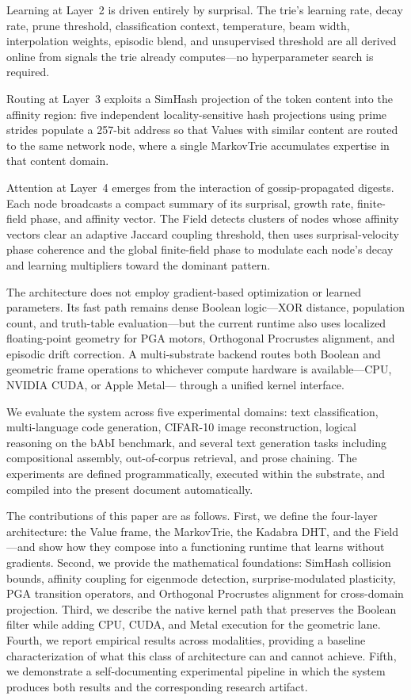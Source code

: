 Learning at Layer~2 is driven entirely by surprisal.  The trie's
learning rate, decay rate, prune threshold, classification context,
temperature, beam width, interpolation weights, episodic blend, and
unsupervised threshold are all derived online from signals the trie
already computes---no hyperparameter search is required.

Routing at Layer~3 exploits a SimHash projection of the token content
into the affinity region: five independent locality-sensitive hash
projections using prime strides populate a 257-bit address so that
Values with similar content are routed to the same network node, where a
single MarkovTrie accumulates expertise in that content domain.

Attention at Layer~4 emerges from the interaction of gossip-propagated
digests.  Each node broadcasts a compact summary of its surprisal,
growth rate, finite-field phase, and affinity vector.  The Field detects
clusters of nodes whose affinity vectors clear an adaptive Jaccard
coupling threshold, then uses surprisal-velocity phase coherence and the
global finite-field phase to modulate each node's decay and learning
multipliers toward the dominant pattern.

The architecture does not employ gradient-based optimization or learned
parameters.  Its fast path remains dense Boolean logic---XOR distance,
population count, and truth-table evaluation---but the current runtime
also uses localized floating-point geometry for PGA motors, Orthogonal
Procrustes alignment, and episodic drift correction.  A multi-substrate
backend routes both Boolean and geometric frame operations to whichever
compute hardware is available---CPU, NVIDIA CUDA, or Apple Metal---
through a unified kernel interface.

We evaluate the system across five experimental domains: text
classification, multi-language code generation, CIFAR-10 image
reconstruction, logical reasoning on the bAbI benchmark, and several
text generation tasks including compositional assembly, out-of-corpus
retrieval, and prose chaining.  The experiments are defined
programmatically, executed within the substrate, and compiled into the
present document automatically.

The contributions of this paper are as follows.  First, we define the
four-layer architecture: the Value frame, the MarkovTrie, the Kadabra
DHT, and the Field---and show how they compose into a functioning
runtime that learns without gradients.  Second, we provide the
mathematical foundations: SimHash collision bounds, affinity coupling
for eigenmode detection, surprise-modulated plasticity, PGA transition
operators, and Orthogonal Procrustes alignment for cross-domain
projection.  Third, we describe the native kernel path that preserves
the Boolean filter while adding CPU, CUDA, and Metal execution for the
geometric lane.  Fourth, we report empirical results across modalities,
providing a baseline characterization of what this class of
architecture can and cannot achieve.  Fifth, we demonstrate a
self-documenting experimental pipeline in which the system produces
both results and the corresponding research artifact.

